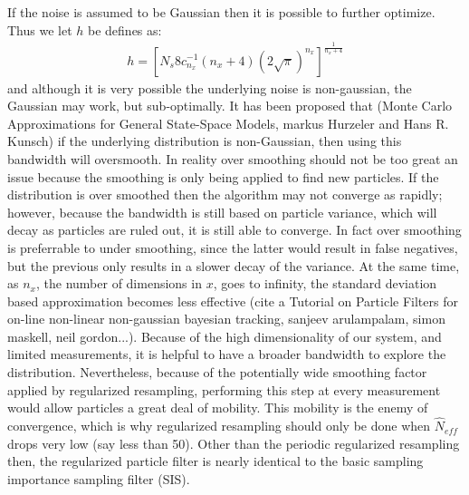 \documentclass{article}
\begin{document}
If the noise is assumed to be Gaussian then it is possible to further optimize. 
Thus we let $h$ be defines as:
\begin{eqnarray}
h = [N_s8c^{-1}_{n_x}(n_x + 4)(2\sqrt{\pi})^{n_x}]^{\frac{1}{n_x +4}}
\end{eqnarray}
and although it is very possible the underlying noise is non-gaussian, the Gaussian
may work, but sub-optimally. It has been proposed that (Monte Carlo Approximations for
General State-Space Models, markus Hurzeler and Hans R. Kunsch) if the underlying 
distribution is non-Gaussian, then using this bandwidth will oversmooth. 
In reality over smoothing
should not be too great an issue because the smoothing is only being applied to find new
particles. If the distribution is over smoothed then the algorithm may not converge as rapidly;
however, because the bandwidth is still based on particle variance, which will decay as 
particles are ruled out, it is still able to converge. In fact over smoothing is preferrable
to under smoothing, since the latter would result in false negatives, but the previous only
results in a slower decay of the variance. 
At the same time, as $n_x$, the number of dimensions in
$x$, goes to infinity, the standard deviation based approximation becomes less effective
(cite a Tutorial on Particle Filters for on-line non-linear non-gaussian bayesian
tracking, sanjeev arulampalam, simon maskell, neil gordon...).  Because of the high dimensionality of our system,
and limited measurements, it is helpful to have a broader bandwidth to explore the distribution. 
Nevertheless, because 
of the potentially wide smoothing factor applied by regularized resampling, performing this
step at every measurement would allow particles a great deal of mobility. This mobility is
the enemy of convergence, which is why regularized resampling should only be done when
$\hat{N}_{eff}$ drops very low (say less than 50). Other than the periodic regularized
resampling then, the regularized particle filter is nearly identical to the basic sampling
importance sampling filter (SIS). 
\end{document}
